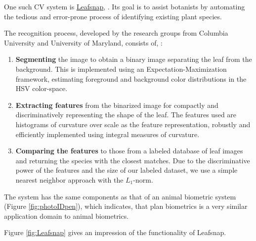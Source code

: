 One such CV system is \href{http://neerajkumar.org/projects/leafsnap/}{\underline{Leafsnap}}, \cite{leafsnap}. Its goal is to assist botanists by automating the tedious and error-prone process of identifying existing plant species. 

The recognition process, developed by the research groups from Columbia University and University of Maryland, consists of, \cite{leafsnap_eccv2012}:
\begin{enumerate}
\item{ {\bf Segmenting} the image to obtain a binary image separating the leaf from the background. This is implemented using an Expectation-Maximization framework, estimating foreground and background color distributions in the HSV color-space.}
\item{{\bf Extracting features} from the binarized image for compactly and discriminatively representing the shape of the leaf. The features used are histograms of curvature over scale as the feature representation, robustly and efficiently implemented using integral measures of curvature.}
\item{{\bf Comparing the features} to those from a labeled database of leaf images and returning the species with the closest matches. Due to the discriminative power of the features and the size of our labeled dataset, we use a simple nearest neighbor approach with the $L_1$-norm.}
\end{enumerate}
The system has the same components as that of an animal biometric system (Figure \ref{fig:photoIDpen}), which indicates, that plan biometrics is a very similar application domain to animal biometrics.

Figure \ref{fig:Leafsnap} gives an impression of the functionality of Leafsnap.

